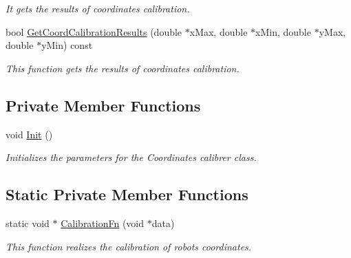 \begin{DoxyCompactItemize}
\begin{DoxyCompactList}\small\item\em It gets the results of coordinates calibration. \item\end{DoxyCompactList}\item 
bool \hyperlink{classCoordinatesCalibrer_a1a3ae703556c2f4c4455792a43fed987}{GetCoordCalibrationResults} (double $\ast$xMax, double $\ast$xMin, double $\ast$yMax, double $\ast$yMin) const 
\begin{DoxyCompactList}\small\item\em This function gets the results of coordinates calibration. \item\end{DoxyCompactList}\end{DoxyCompactItemize}
\subsection*{Private Member Functions}
\begin{DoxyCompactItemize}
\item 
void \hyperlink{classCoordinatesCalibrer_a19faab9e443f7ef64462a36c19baf6bc}{Init} ()
\begin{DoxyCompactList}\small\item\em Initializes the parameters for the Coordinates calibrer class. \item\end{DoxyCompactList}\end{DoxyCompactItemize}
\subsection*{Static Private Member Functions}
\begin{DoxyCompactItemize}
\item 
static void $\ast$ \hyperlink{classCoordinatesCalibrer_a4ce4c153ae8c3e50faccfba40e6bc4ea}{CalibrationFn} (void $\ast$data)
\begin{DoxyCompactList}\small\item\em This function realizes the calibration of robots coordinates. \item\end{DoxyCompactList}\end{DoxyCompactItemize}
